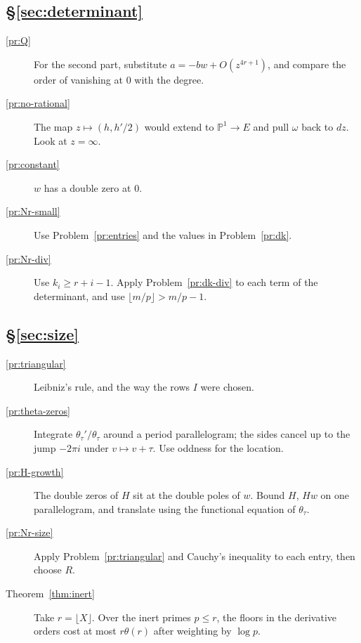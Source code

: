 \documentclass[reqno]{amsart}
\theoremstyle{definition}
\theoremstyle{plain}
\begin{document}
\subsection*{\S\ref{sec:determinant}}
\begin{description}
\item[\ref{pr:Q}] For the second part, substitute \(a = -bw + O(z^{4r+1})\), and compare the order of vanishing at \(0\) with the degree.
\item[\ref{pr:no-rational}] The map \(z \mapsto (h, h'/2)\) would extend to \(\mathbb P^1 \to E\) and pull \(\omega\) back to \(dz\).  Look at \(z = \infty\).
\item[\ref{pr:constant}] \(w\) has a double zero at \(0\).
\item[\ref{pr:Nr-small}] Use Problem~\ref{pr:entries} and the values in Problem~\ref{pr:dk}.
\item[\ref{pr:Nr-div}] Use \(k_i \ge r + i - 1\).  Apply Problem~\ref{pr:dk-div} to each term of the determinant, and use \(\lfloor m/p \rfloor > m/p - 1\).
\end{description}

\subsection*{\S\ref{sec:size}}
\begin{description}
\item[\ref{pr:triangular}] Leibniz's rule, and the way the rows \(I\) were chosen.
\item[\ref{pr:theta-zeros}] Integrate \(\theta_\tau'/\theta_\tau\) around a period parallelogram; the sides cancel up to the jump \(-2\pi i\) under \(v \mapsto v + \tau\).  Use oddness for the location.
\item[\ref{pr:H-growth}] The double zeros of \(H\) sit at the double poles of \(w\).  Bound \(H\), \(Hw\) on one parallelogram, and translate using the functional equation of \(\theta_\tau\).
\item[\ref{pr:Nr-size}] Apply Problem~\ref{pr:triangular} and Cauchy's inequality to each entry, then choose \(R\).
\item[Theorem~\ref{thm:inert}] Take \(r = \lfloor X \rfloor\).  Over the inert primes \(p \le r\), the floors in the derivative orders cost at most \(r\theta(r)\) after weighting by \(\log p\).
\end{description}
\end{document}

